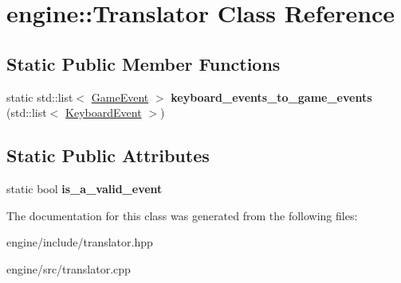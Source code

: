\hypertarget{classengine_1_1_translator}{}\section{engine\+:\+:Translator Class Reference}
\label{classengine_1_1_translator}
\subsection*{Static Public Member Functions}
\begin{DoxyCompactItemize}
\item 
static std\+::list$<$ \hyperlink{class_game_event}{Game\+Event} $>$ {\bfseries keyboard\+\_\+events\+\_\+to\+\_\+game\+\_\+events} (std\+::list$<$ \hyperlink{classengine_1_1_keyboard_event}{Keyboard\+Event} $>$)\hypertarget{classengine_1_1_translator_af01485c63cb4b6e16546f526a6c7c18a}{}\label{classengine_1_1_translator_af01485c63cb4b6e16546f526a6c7c18a}

\end{DoxyCompactItemize}
\subsection*{Static Public Attributes}
\begin{DoxyCompactItemize}
\item 
static bool {\bfseries is\+\_\+a\+\_\+valid\+\_\+event}\hypertarget{classengine_1_1_translator_af5c5dfc421009f711b048cfa95d3f3a5}{}\label{classengine_1_1_translator_af5c5dfc421009f711b048cfa95d3f3a5}

\end{DoxyCompactItemize}


The documentation for this class was generated from the following files\+:\begin{DoxyCompactItemize}
\item 
engine/include/translator.\+hpp\item 
engine/src/translator.\+cpp\end{DoxyCompactItemize}
